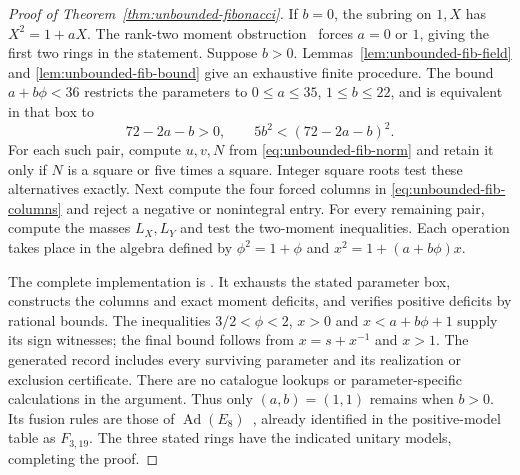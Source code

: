 \begin{proof}[Proof of Theorem~\ref{thm:unbounded-fibonacci}]
If $b=0$, the subring on $1,X$ has $X^2=1+aX$.
The rank-two moment obstruction~\cite[Proposition~\ref{B-prop:ranktwo}]{Finite} forces $a=0$ or $1$,
giving the first two rings in the statement. Suppose $b>0$.
Lemmas~\ref{lem:unbounded-fib-field} and
\ref{lem:unbounded-fib-bound} give an exhaustive finite procedure.
The bound $a+b\phi<36$ restricts the parameters to
$0\leq a\leq35$, $1\leq b\leq22$, and is equivalent in that box to
\[
 72-2a-b>0,\qquad 5b^2<(72-2a-b)^2.
\]
For each such pair, compute $u,v,N$ from
\eqref{eq:unbounded-fib-norm} and retain it only if $N$ is a square
or five times a square. Integer square roots test these alternatives
exactly. Next compute the four forced columns in
\eqref{eq:unbounded-fib-columns} and reject a negative or nonintegral
entry. For every remaining pair, compute the masses $L_X,L_Y$ and
test the two-moment inequalities. Each operation takes place in the
algebra defined by $\phi^2=1+\phi$ and $x^2=1+(a+b\phi)x$.

The complete implementation is
.
It exhausts the stated parameter box, constructs the columns and exact
moment deficits, and verifies positive deficits by rational bounds.
The inequalities $3/2<\phi<2$, $x>0$ and $x<a+b\phi+1$ supply its
sign witnesses; the final bound follows from $x=s+x^{-1}$ and $x>1$.
The generated record includes every surviving parameter and its
realization or exclusion certificate. There are no catalogue lookups
or parameter-specific calculations in the argument.
Thus only $(a,b)=(1,1)$ remains when $b>0$. Its fusion rules are those
of $\operatorname{Ad}(E_8)$~\cite{EvansJones}, already identified in the
positive-model table as $F_{3,19}$. The three stated rings have the indicated unitary
models, completing the proof.
\end{proof}
